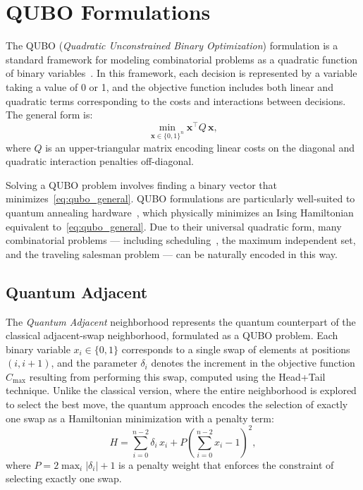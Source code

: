 \documentclass[10pt,twoside,twocolumn,a4paper]{article}
\begin{document}
\section{QUBO Formulations}
The QUBO (\emph{Quadratic Unconstrained Binary Optimization}) formulation is a standard framework for modeling combinatorial problems as a quadratic function of binary variables~\cite{lucas2014ising,dwave_handbook}. In this framework, each decision is represented by a variable taking a value of 0 or 1, and the objective function includes both linear and quadratic terms corresponding to the costs and interactions between decisions. The general form is:
\begin{equation}
    \min_{\mathbf{x}\in\{0,1\}^n} \mathbf{x}^\top Q\,\mathbf{x},
    \label{eq:qubo_general}
\end{equation}
where $Q$ is an upper-triangular matrix encoding linear costs on the diagonal and quadratic interaction penalties off-diagonal.

Solving a QUBO problem involves finding a binary vector that minimizes~\eqref{eq:qubo_general}. QUBO formulations are particularly well-suited to quantum annealing hardware~\cite{dwave_handbook}, which physically minimizes an Ising Hamiltonian equivalent to~\eqref{eq:qubo_general}. Due to their universal quadratic form, many combinatorial problems --- including scheduling~\cite{lucas2014ising}, the maximum independent set, and the traveling salesman problem --- can be naturally encoded in this way.

\subsection{Quantum Adjacent}
The \emph{Quantum Adjacent} neighborhood represents the quantum counterpart of the classical adjacent-swap neighborhood, formulated as a QUBO problem. Each binary variable $x_i \in \{0,1\}$ corresponds to a single swap of elements at positions $(i, i+1)$, and the parameter $\delta_i$ denotes the increment in the objective function $C_{\max}$ resulting from performing this swap, computed using the Head+Tail technique. Unlike the classical version, where the entire neighborhood is explored to select the best move, the quantum approach encodes the selection of exactly one swap as a Hamiltonian minimization with a penalty term:
\begin{equation}
    H = \sum_{i=0}^{n-2} \delta_i\, x_i
        + P \!\left(\sum_{i=0}^{n-2} x_i - 1\right)^{\!2},
    \label{eq:qubo_adj}
\end{equation}
where $P = 2\max_i|\delta_i|+1$ is a penalty weight that enforces the constraint of selecting exactly one swap.
\end{document}
